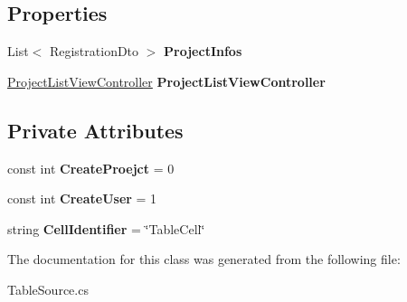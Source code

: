 \subsection*{Properties}
\begin{DoxyCompactItemize}
\item 
\mbox{\label{class_ramboell_1_1i_o_s_1_1_table_source_ae0fe7793c01c2b4f396d7dab4b6e37f5}} 
List$<$ Registration\+Dto $>$ {\bfseries Project\+Infos}
\item 
\mbox{\label{class_ramboell_1_1i_o_s_1_1_table_source_afa2c9dfc0246691be13b51d1ae005395}} 
\hyperlink{class_ramboell_1_1i_o_s_1_1_project_list_view_controller}{Project\+List\+View\+Controller} {\bfseries Project\+List\+View\+Controller}
\end{DoxyCompactItemize}
\subsection*{Private Attributes}
\begin{DoxyCompactItemize}
\item 
\mbox{\label{class_ramboell_1_1i_o_s_1_1_table_source_abef74a5e22f05b9d396fdf75a04157ea}} 
const int {\bfseries Create\+Proejct} = 0
\item 
\mbox{\label{class_ramboell_1_1i_o_s_1_1_table_source_a337b1fdd687a20321bc53492f682f20e}} 
const int {\bfseries Create\+User} = 1
\item 
\mbox{\label{class_ramboell_1_1i_o_s_1_1_table_source_a48b6eb2c6e8feff06a5980b2bfb187d9}} 
string {\bfseries Cell\+Identifier} = \char`\"{}Table\+Cell\char`\"{}
\end{DoxyCompactItemize}


The documentation for this class was generated from the following file\+:\begin{DoxyCompactItemize}
\item 
Table\+Source.\+cs\end{DoxyCompactItemize}
